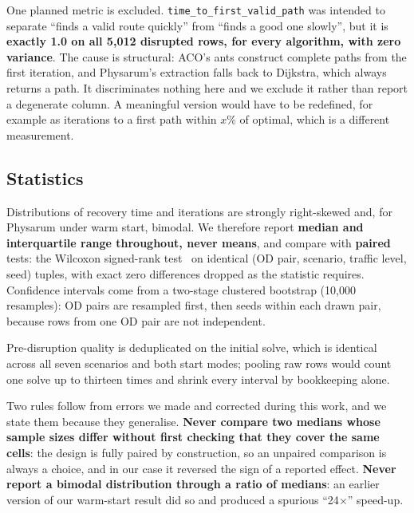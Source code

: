 One planned metric is excluded. \texttt{time\_to\_first\_valid\_path} was
intended to separate ``finds a valid route quickly'' from ``finds a good one
slowly'', but it is \textbf{exactly 1.0 on all 5{,}012 disrupted rows, for
every algorithm, with zero variance}. The cause is structural: ACO's ants
construct complete paths from the first iteration, and Physarum's extraction
falls back to Dijkstra, which always returns a path. It discriminates
nothing here and we exclude it rather than report a degenerate column. A
meaningful version would have to be redefined, for example as iterations to a first path within
$x\%$ of optimal, which is a different measurement.

\subsection{Statistics}

Distributions of recovery time and iterations are strongly right-skewed and,
for Physarum under warm start, bimodal. We therefore report \textbf{median
and interquartile range throughout, never means}, and compare with
\textbf{paired} tests: the Wilcoxon signed-rank
test~\cite{wilcoxon1945individual} on identical (OD pair, scenario, traffic
level, seed) tuples, with exact zero differences dropped as the statistic
requires. Confidence intervals come from a two-stage clustered bootstrap
(10{,}000 resamples): OD pairs are resampled first, then seeds within each
drawn pair, because rows from one OD pair are not independent.

Pre-disruption quality is deduplicated on the initial solve, which is
identical across all seven scenarios and both start modes; pooling raw rows
would count one solve up to thirteen times and shrink every interval by
bookkeeping alone.

Two rules follow from errors we made and corrected during this work, and we
state them because they generalise. \textbf{Never compare two medians whose
sample sizes differ without first checking that they cover the same cells}:
the design is fully paired by construction, so an unpaired comparison is
always a choice, and in our case it reversed the sign of a reported effect.
\textbf{Never report a bimodal distribution through a ratio of medians}: an
earlier version of our warm-start result did so and produced a spurious
``24$\times$'' speed-up.
